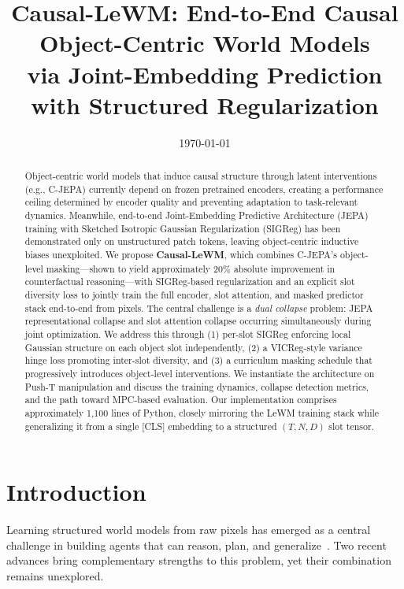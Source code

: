 \documentclass[12pt]{article}
\title{\vspace{-2em}\textbf{Causal-LeWM: End-to-End Causal Object-Centric World Models\\ via Joint-Embedding Prediction with Structured Regularization}\vspace{-1em}}
\author{
}
\date{\today}
\begin{document}
\maketitle

\begin{abstract}
Object-centric world models that induce causal structure through latent interventions (e.g., C-JEPA) currently depend on frozen pretrained encoders, creating a performance ceiling determined by encoder quality and preventing adaptation to task-relevant dynamics. Meanwhile, end-to-end Joint-Embedding Predictive Architecture (JEPA) training with Sketched Isotropic Gaussian Regularization (SIGReg) has been demonstrated only on unstructured patch tokens, leaving object-centric inductive biases unexploited. We propose \textbf{Causal-LeWM}, which combines C-JEPA's object-level masking---shown to yield approximately $20\%$ absolute improvement in counterfactual reasoning---with SIGReg-based regularization and an explicit slot diversity loss to jointly train the full encoder, slot attention, and masked predictor stack end-to-end from pixels. The central challenge is a \emph{dual collapse} problem: JEPA representational collapse and slot attention collapse occurring simultaneously during joint optimization. We address this through (1) per-slot SIGReg enforcing local Gaussian structure on each object slot independently, (2) a VICReg-style variance hinge loss promoting inter-slot diversity, and (3) a curriculum masking schedule that progressively introduces object-level interventions. We instantiate the architecture on Push-T manipulation and discuss the training dynamics, collapse detection metrics, and the path toward MPC-based evaluation. Our implementation comprises approximately 1,100 lines of Python, closely mirroring the LeWM training stack while generalizing it from a single [CLS] embedding to a structured $(T, N, D)$ slot tensor.
\end{abstract}

\section{Introduction}

Learning structured world models from raw pixels has emerged as a central challenge in building agents that can reason, plan, and generalize~\citep{lecun2022}. Two recent advances bring complementary strengths to this problem, yet their combination remains unexplored.
\end{document}
